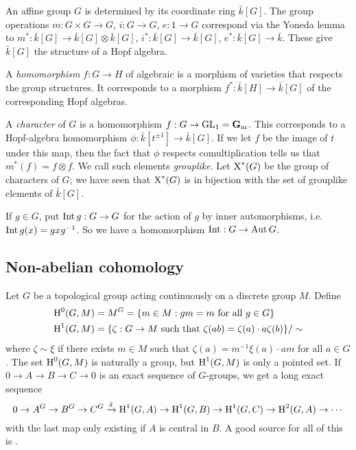 An affine group $G$ is determined by its coordinate ring $\bar k[G]$. The 
group operations $m:G\times G\to G$, $i:G\to G$, $e:1\to G$ correspond via 
the Yoneda lemma to $m^\ast:\bar k[G]\to \bar k[G]\otimes \bar k[G]$, 
$i^\ast:\bar k[G] \to \bar k[G]$, $e^\ast:\bar k[G] \to \bar k$. These give 
$\bar k[G]$ the structure of a Hopf algebra. 

A \emph{homomorphism} $f:G\to H$ of algebraic is a morphism of varieties that 
respects the group structures. It corresponds to a morphism 
$f^\ast:\bar k[H] \to \bar k[G]$ of the corresponding Hopf algebras. 

A \emph{character} of $G$ is a homomorphism 
$f:G\to \operatorname{GL}_1 = \mathbf{G}_{\mathrm{m}}$. This corresponds to a 
Hopf-algebra homomorphism $\phi:\bar k[t^{\pm 1}] \to \bar k[G]$. If we let $f$ 
be the image of $t$ under this map, then the fact that $\phi$ respects 
comultiplication tells us that $m^\ast(f) = f\otimes f$. We call such 
elements \emph{grouplike}. Let $\operatorname{X}^\ast(G)$ be the group of characters 
of $G$; we have seen that $\operatorname{X}^\ast(G)$ is in bijection with the set 
of grouplike elements of $\bar k[G]$. 

If $g\in G$, put $\operatorname{Int} g:G\to G$ for the action of $g$ by inner 
automorphisms, i.e.\ $\operatorname{Int} g(x) = g x g^{-1}$. So we have a homomorphism 
$\operatorname{Int}:G\to \operatorname{Aut} G$. 





\subsection{Non-abelian cohomology}

Let $G$ be a topological group acting continuously on a discrete group $M$. 
Define 
\begin{align*}
  \operatorname{H}^0(G,M) &= M^G = \{m\in M:g m=m\text{ for all }g\in G\} \\
  \operatorname{H}^1(G,M) &= \{\zeta:G\to M\text{ such that }\zeta(a b) = \zeta(a)\cdot a \zeta(b)\} / \sim 
\end{align*}
where $\zeta\sim \xi$ if there exists $m\in M$ such that 
$\zeta(a) = m^{-1} \xi(a) \cdot a m$ for all $a\in G$. The set $\operatorname{H}^0(G,M)$ is 
naturally a group, but $\operatorname{H}^1(G,M)$ is only a pointed set. If 
$0 \to A \to B \to C \to 0$ is an exact sequence of $G$-groups, we get a long 
exact sequence 
\[
  0 \to A^G \to B^G \to C^G \xrightarrow\delta \operatorname{H}^1(G,A) \to \operatorname{H}^1(G,B) \to \operatorname{H}^1(G,C) \to \operatorname{H}^2(G,A) \to \cdots 
\]
with the last map only existing if $A$ is central in $B$. A good source for all 
of this is \cite{s79}. 

